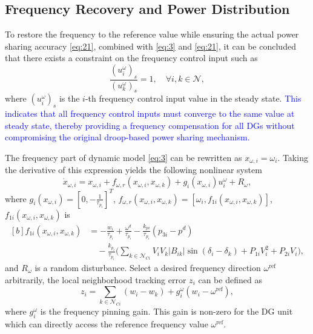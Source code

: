 \documentclass[]{interact}
\theoremstyle{plain}%
\theoremstyle{definition}
\theoremstyle{remark}
\begin{document}
\subsection{Frequency Recovery and Power Distribution}

To restore the frequency to the reference value while ensuring the actual power sharing accuracy \eqref{eq:21}, combined with \eqref{eq:3} and \eqref{eq:21}, it can be concluded that there exists a constraint on the frequency control input such as 
\begin{equation}
\frac{(u_i^\omega)_s}{(u_k^\omega)_s} = 1, \quad \forall i,k \in \mathcal{N},
\end{equation}
where \((u_i^\omega)_s\) is the \(i\)-th frequency control input value in the steady state. 
\textcolor{blue}{This indicates that all frequency control inputs must converge to the same value at steady state, thereby providing a frequency compensation for all DGs without compromising the original droop-based power sharing mechanism.}

The frequency part of dynamic model \eqref{eq:3} can be rewritten as $x_{\omega,i} = \omega_i$. Taking the derivative of this expression yields the following nonlinear system
\begin{equation}
\dot{x}_{\omega,i} = x_{\omega,i} + f_{\omega,r}(x_{\omega,i}, x_{\omega,k}) + g_i(x_{\omega,i}) u_i^\omega + R_\omega,
\end{equation}
where \( g_i(x_{\omega,i}) = [0, -\frac{1}{\tau_{p_i}}]^T \), \( f_{\omega,r}(x_{\omega,i}, x_{\omega,k}) = [\omega_i, f_{1i}(x_{\omega,i}, x_{\omega,k})] \), \( f_{1i}(x_{\omega,i}, x_{\omega,k}) \) is
\begin{equation}
\begin{aligned}[b]
f_{1i}(x_{\omega,i}, x_{\omega,k}) &= -\frac{w_i}{\tau_{p_i}} + \frac{\omega^d}{\tau_{p_i}} - \frac{k_{pi}}{\tau_{p_i}} (p_{3i} - p^d) \\
&\quad - \frac{k_{p_i}}{\tau_{p_i}} \bigg( \sum_{k \in \mathcal{N}_{Ci}} V_i V_k |B_{ik}| \sin(\delta_i - \delta_k)  + P_{1i} V_i^2 + P_{2i} V_i \bigg),
\end{aligned}
\end{equation}
and \( R_\omega \) is a random disturbance.
Select a desired frequency direction \( \omega^{\text{ref}} \) arbitrarily, the local neighborhood tracking error $z_i$ can be defined as
\begin{equation}
\label{eq:z_i_f}
z_i = \sum_{k \in \mathcal{N}_{Ci}} (w_i - w_k) + g_i^\omega (w_i - \omega^{\text{ref}}),
\end{equation}
where \( g_i^\omega \) is the frequency pinning gain. This gain is non-zero for the DG unit which can directly access the reference frequency value \( \omega^{\text{ref}} \).
\end{document}
